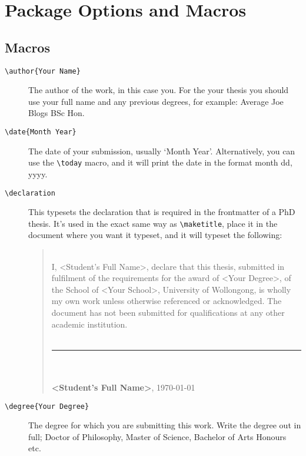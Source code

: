 \documentclass[12pt,oneside]{article}
\newcommand{\oporcom}[1]{\texttt{\color{RoyalBlue}#1}} %
\newcommand{\comoptions}[1]{\texttt{\color{Gray}#1}} %
\begin{document}
\section{Package Options and Macros}
\subsection*{Macros}
\begin{description}
    \item[\oporcom{\textbackslash{}author}\comoptions{\{Your Name\}}]
    The author of the work, in this case you. For the your thesis you should use your full name and any previous degrees, for example: Average Joe Blogs BSc Hon.
    
    \item[\oporcom{\textbackslash{}date}\comoptions{\{Month Year\}}]
    The date of your submission, usually `Month Year'. Alternatively, you can use the \oporcom{\textbackslash{}today} macro, and it will print the date in the format month dd, yyyy.
    
    \item[\oporcom{\textbackslash{}declaration}] This typesets the declaration that is required in the frontmatter of a PhD thesis. It's used in the exact same way as \oporcom{\textbackslash{}maketitle}, place it in the document where you want it typeset, and it will typeset the following:
\begin{quote}
    \\

    \noindent I, \textless{}Student's Full Name\textgreater, declare that this thesis, submitted in fulfilment of the requirements for the award of \textless{}Your Degree\textgreater, of the School of \textless{}Your School\textgreater, University of Wollongong, is wholly my own work unless otherwise referenced or acknowledged. The document has not been submitted for qualifications at any other academic institution.\\
    \vspace{16mm}\\
    \noindent\rule{0.4\textwidth}{1pt}\\
    \vspace{8mm}\\
    \textbf{\textless{}Student's Full Name\textgreater}, \today\\
\end{quote}
    
    \item[\oporcom{\textbackslash{}degree}\comoptions{\{Your Degree\}}]
    The degree for which you are submitting this work. Write the degree out in full; Doctor of Philosophy, Master of Science, Bachelor of Arts Honours etc.
    

\end{description}
\end{document}
